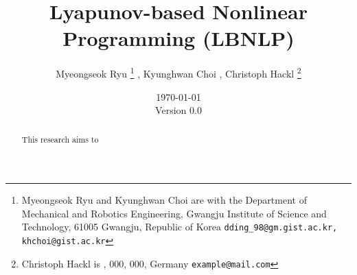 \documentclass{article}
\title{
    Lyapunov-based Nonlinear Programming (LBNLP)
}
\author{
    Myeongseok Ryu
    \thanks{
        Myeongseok Ryu and Kyunghwan Choi are with the Department of Mechanical and Robotics Engineering, Gwangju Institute of Science and Technology, 61005 Gwangju, Republic of Korea {\tt\small dding\_98@gm.gist.ac.kr, khchoi@gist.ac.kr}}%
    ,
    Kyunghwan Choi
    \footnotemark[1]
    , 
    Christoph Hackl
    \thanks{Christoph Hackl is , 000, 000, Germany {\tt\small example@mail.com}}%
}
\date{
    \today
    \\
    Version 0.0
}
\newcommand*{\template}{../template}
\begin{document}
\maketitle

\begin{abstract}
    This research aims to 
\end{abstract}

\tableofcontents







\begin{appendices}
\end{appendices}



\end{document}
